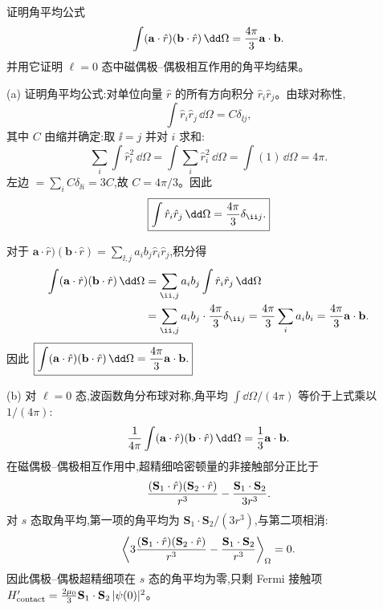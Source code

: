 \begin{question}
证明角平均公式
\[
\int (\mathbf a\cdot\hat r)(\mathbf b\cdot\hat r)\,\dd\Omega={4\pi\over3}\mathbf a\cdot\mathbf b.
\]
并用它证明 $\ell=0$ 态中磁偶极--偶极相互作用的角平均结果。
\end{question}
\begin{solution}
(a) 证明角平均公式:对单位向量 $\hat r$ 的所有方向积分 $\hat r_i\hat r_j$。由球对称性,
\[
\int \hat r_i\hat r_j\,\dd\Omega = C\delta_{\ii j},
\]
其中 $C$ 由缩并确定:取 $\ii=j$ 并对 $i$ 求和:
\[
\sum_i\int \hat r_i^2\,\dd\Omega = \int \sum_i \hat r_i^2\,\dd\Omega = \int (1)\,\dd\Omega = 4\pi.
\]
左边 $=\sum_i C\delta_{\ii i} = 3C$,故 $C=4\pi/3$。因此
\[
\boxed{\int \hat r_i\hat r_j\,\dd\Omega={4\pi\over3}\delta_{\ii j}.}
\]

对于 $\mathbf a\cdot\hat r)(\mathbf b\cdot\hat r) = \sum_{\ii,j}a_i b_j \hat r_i\hat r_j$,积分得
\[
\begin{aligned}
\int (\mathbf a\cdot\hat r)(\mathbf b\cdot\hat r)\,\dd\Omega
&= \sum_{\ii,j} a_i b_j \int \hat r_i\hat r_j\,\dd\Omega \\
&= \sum_{\ii,j} a_i b_j \cdot {4\pi\over3}\delta_{\ii j}
= {4\pi\over3}\sum_i a_i b_i
= {4\pi\over3}\mathbf a\cdot\mathbf b.
\end{aligned}
\]
因此 $\boxed{\int(\mathbf a\cdot\hat r)(\mathbf b\cdot\hat r)\,\dd\Omega={4\pi\over3}\mathbf a\cdot\mathbf b.}$

(b) 对 $\ell=0$ 态,波函数角分布球对称,角平均 $\int\dd\Omega/(4\pi)$ 等价于上式乘以 $1/(4\pi)$:
\[
{1\over4\pi}\int (\mathbf a\cdot\hat r)(\mathbf b\cdot\hat r)\,\dd\Omega = {1\over3}\mathbf a\cdot\mathbf b.
\]
在磁偶极--偶极相互作用中,超精细哈密顿量的非接触部分正比于
\[
{(\mathbf S_1\cdot\hat r)(\mathbf S_2\cdot\hat r)\over r^3} - {\mathbf S_1\cdot\mathbf S_2\over 3r^3}.
\]
对 $s$ 态取角平均,第一项的角平均为 $\mathbf S_1\cdot\mathbf S_2/(3r^3)$,与第二项相消:
\[
\left\langle 3{(\mathbf S_1\cdot\hat r)(\mathbf S_2\cdot\hat r)\over r^3} - {\mathbf S_1\cdot\mathbf S_2\over r^3}\right\rangle_{\Omega} = 0.
\]
因此偶极--偶极超精细项在 $s$ 态的角平均为零,只剩 Fermi 接触项 $H'_{\rm contact} = {2\mu_0\over3}\mathbf S_1\cdot\mathbf S_2\,|\psi(0)|^2$。
\end{solution}

